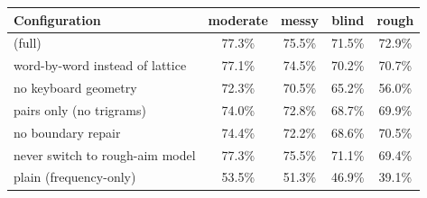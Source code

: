 \begin{tabular}{lcccc}
\toprule
Configuration & moderate & messy & blind & rough \\
\midrule
\qk{} (full) & 77.3\% & 75.5\% & 71.5\% & 72.9\% \\\midrule
word-by-word instead of lattice & 77.1\% & 74.5\% & 70.2\% & 70.7\% \\
no keyboard geometry & 72.3\% & 70.5\% & 65.2\% & 56.0\% \\
pairs only (no trigrams) & 74.0\% & 72.8\% & 68.7\% & 69.9\% \\
no boundary repair & 74.4\% & 72.2\% & 68.6\% & 70.5\% \\
never switch to rough-aim model & 77.3\% & 75.5\% & 71.1\% & 69.4\% \\
plain (frequency-only) & 53.5\% & 51.3\% & 46.9\% & 39.1\% \\
\bottomrule
\end{tabular}
